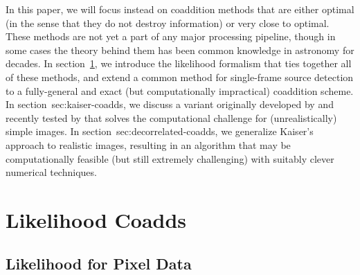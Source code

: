 \documentclass[10pt]{article}
\begin{document}
In this paper, we will focus instead on coaddition methods that are either optimal (in the sense that they do not destroy information) or very close to optimal.  These methods are not yet a part of any major processing pipeline, though in some cases the theory behind them has been common knowledge in astronomy for decades.  In section~\ref{sec:likelihood-coadds}, we introduce the likelihood formalism that ties together all of these methods, and extend a common method for single-frame source detection to a fully-general and exact (but computationally impractical) coaddition scheme.  In section~{sec:kaiser-coadds}, we discuss a variant originally developed by \cite{Kaiser2001} and recently tested by \cite{2015arXiv151206879Z} that solves the computational challenge for (unrealistically) simple images.  In section~{sec:decorrelated-coadds}, we generalize Kaiser's approach to realistic images, resulting in an algorithm that may be computationally feasible (but still extremely challenging) with suitably clever numerical techniques.

\section{Likelihood Coadds}
\label{sec:likelihood-coadds}

\subsection{Likelihood for Pixel Data}
\label{sec:pixel-likelihood}
\end{document}
